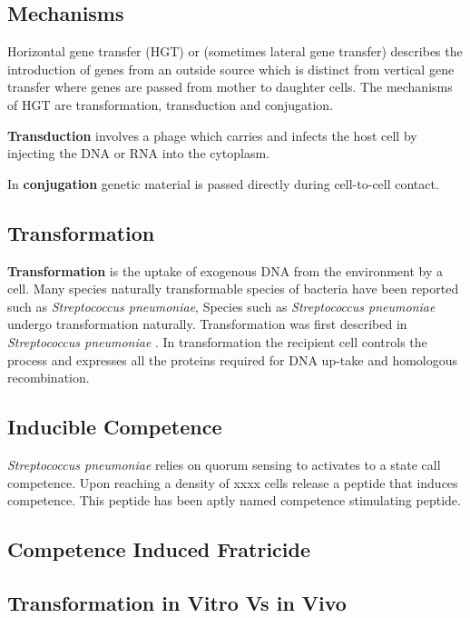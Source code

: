 \subsection{Mechanisms}

Horizontal gene transfer (HGT) or (sometimes lateral gene transfer) describes the introduction of genes from an outside source which is distinct from vertical gene transfer where genes are passed from mother to daughter cells. The mechanisms of HGT are transformation, transduction and conjugation.



\textbf{Transduction} involves a phage which carries and infects the host cell by injecting the DNA or RNA into the cytoplasm. 

In \textbf{conjugation} genetic material is passed directly during cell-to-cell contact.

\subsection{Transformation}

\textbf{Transformation} is the uptake of exogenous DNA from the environment by a cell\cite{Johnston2014}.
Many species naturally transformable species of bacteria have been reported such as \textit{Streptococcus pneumoniae},  
Species such as \textit{Streptococcus pneumoniae} undergo transformation naturally.
Transformation was first described in \textit{Streptococcus pneumoniae} \cite{Griffith1928}.
In transformation the recipient cell controls the process and expresses all the proteins required for DNA up-take and homologous recombination.

\subsection{Inducible Competence}

\textit{Streptococcus pneumoniae} relies on quorum sensing to activates to a state call competence.
Upon reaching a density of xxxx cells release a peptide that induces competence.
This peptide has been aptly named competence stimulating peptide.

\subsection{Competence Induced Fratricide}
 
\subsection{Transformation in Vitro Vs in Vivo}

